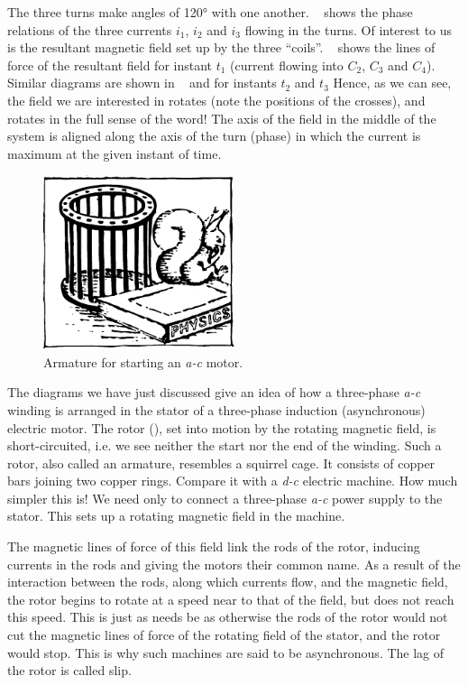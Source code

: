 The three turns make angles of \ang{120} with one another. ~ shows the phase relations of the three currents $i_{1}$, $i_{2}$ and $i_{3}$ flowing in the turns. Of interest to us is the resultant magnetic field set up by the three ``coils''. ~ shows the lines of force of the resultant field for instant $t_{1}$ (current flowing into $C_{2}$, $C_{3}$ and $C_{4}$). Similar diagrams are shown in ~ and  for instants $t_{2}$ and $t_{3}$ Hence, as we can see, the field we are interested in rotates (note the positions of the crosses), and rotates in the full sense of the word! The axis of the field in the middle of the system is aligned along the axis of the turn (phase) in which the current is maximum at the given instant of time.

\begin{figure}[!ht]
\centering
\includegraphics[width=0.5\textwidth]{figures/fig-04-09.pdf}
\caption{Armature for starting an \emph{a-c} motor.}
\label{fig-4.9}
\end{figure}

The diagrams we have just discussed give an idea of how a three-phase \emph{a-c} winding is arranged in the stator of a three-phase induction (asynchronous) electric motor. The rotor (), set into motion by the rotating magnetic field, is short-circuited, i.e. we see neither the start nor the end of the winding. Such a rotor, also called an armature, resembles a squirrel cage. It consists of copper bars joining two copper rings. Compare it with a \emph{d-c} electric machine. How much simpler this is! We need only to connect a three-phase \emph{a-c} power supply to the stator. This sets up a rotating magnetic field in the machine. 

The magnetic lines of force of this field link the rods of the rotor, inducing currents in the rods and giving the motors their common name. As a result of the interaction between the rods, along which currents flow, and the magnetic field, the rotor begins to rotate at a speed near to that of the field, but does not reach this speed. This is just as needs be as otherwise the rods of the rotor would not cut the magnetic lines of force of the rotating field of the stator, and the rotor would stop. This is why such machines are said to be asynchronous. The lag of the rotor is called slip.

